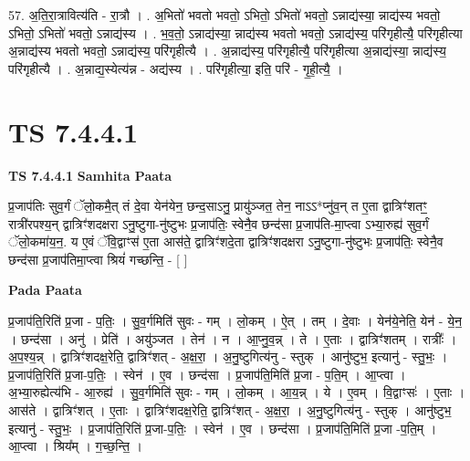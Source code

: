 \documentclass[17pt]{extarticle}
\begin{document}
57. अ॒ति॒रा॒त्रावित्य॑ति - रा॒त्रौ । . अ॒भितो॑ भवतो भवतो॒ ऽभितो॒ ऽभितो॑ भवतो॒ ऽन्नाद्य॑स्या॒ न्नाद्य॑स्य भवतो॒ ऽभितो॒ ऽभितो॑ भवतो॒ ऽन्नाद्य॑स्य । . भ॒व॒तो॒ ऽन्नाद्य॑स्या॒ न्नाद्य॑स्य भवतो भवतो॒ ऽन्नाद्य॑स्य॒ परि॑गृहीत्यै॒ परि॑गृहीत्या अ॒न्नाद्य॑स्य भवतो भवतो॒ ऽन्नाद्य॑स्य॒ परि॑गृहीत्यै । . अ॒न्नाद्य॑स्य॒ परि॑गृहीत्यै॒ परि॑गृहीत्या अ॒न्नाद्य॑स्या॒ न्नाद्य॑स्य॒ परि॑गृहीत्यै । . अ॒न्नाद्य॒स्येत्य॑न्न - अद्य॑स्य । . परि॑गृहीत्या॒ इति॒ परि॑ - गृ॒ही॒त्यै॒ । \newline
\pagebreak
{}

\section{ TS 7.4.4.1 }

\textbf{TS 7.4.4.1 } \newline
\textbf{Samhita Paata} \newline

प्र॒जाप॑तिः सुव॒र्गं ॅलो॒कमै॒त् तं दे॒वा येन॑येन॒ छन्द॒साऽनु॒ प्रायु॑ञ्जत॒ तेन॒ नाऽऽ*प्नु॑व॒न् त ए॒ता द्वात्रिꣳ॑शतꣳ॒॒ रात्री॑रपश्य॒न् द्वात्रिꣳ॑शदक्षरा ऽनु॒ष्टुगा-नु॑ष्टुभः प्र॒जाप॑तिः॒ स्वेनै॒व छन्द॑सा प्र॒जाप॑ति-मा॒प्त्वा ऽभ्या॒रुह्य॑ सुव॒र्गं ॅलो॒कमा॑य॒न॒. य ए॒वं ॅवि॒द्वाꣳस॑ ए॒ता आस॑ते॒ द्वात्रिꣳ॑शदे॒ता द्वात्रिꣳ॑शदक्षरा ऽनु॒ष्टुगा-नु॑ष्टुभः प्र॒जाप॑तिः॒ स्वेनै॒व छन्द॑सा प्र॒जाप॑तिमा॒प्त्वा श्रियं॑ गच्छन्ति॒ - [  ] \newline

\textbf{Pada Paata} \newline

प्र॒जाप॑ति॒रिति॑ प्र॒जा - प॒तिः॒ । सु॒व॒र्गमिति॑ सुवः - गम् । लो॒कम् । ऐ॒त् । तम् । दे॒वाः । येन॑ये॒नेति॒ येन॑ - ये॒न॒ । छन्द॑सा । अनु॑ । प्रेति॑ । अयु॑ञ्जत । तेन॑ । न । आ॒प्नु॒व॒न्न् । ते । ए॒ताः । द्वात्रिꣳ॑शतम् । रात्रीः᳚ । अ॒प॒श्य॒न्न् । द्वात्रिꣳ॑शदक्ष॒रेति॒ द्वात्रिꣳ॑शत् - अ॒क्ष॒रा॒ । अ॒नु॒ष्टुगित्य॑नु - स्तुक् । आनु॑ष्टुभ॒ इत्यानु॑ - स्तु॒भः॒ । प्र॒जाप॑ति॒रिति॑ प्र॒जा-प॒तिः॒ । स्वेन॑ । ए॒व । छन्द॑सा । प्र॒जाप॑ति॒मिति॑ प्र॒जा - प॒ति॒म् । आ॒प्त्वा । अ॒भ्या॒रुह्येत्य॑भि - आ॒रुह्य॑ । सु॒व॒र्गमिति॑ सुवः - गम् । लो॒कम् । आ॒य॒न्न् । ये । ए॒वम् । वि॒द्वाꣳसः॑ । ए॒ताः । आस॑ते । द्वात्रिꣳ॑शत् । ए॒ताः । द्वात्रिꣳ॑शदक्ष॒रेति॒ द्वात्रिꣳ॑शत् - अ॒क्ष॒रा॒ । अ॒नु॒ष्टुगित्य॑नु - स्तुक् । आनु॑ष्टुभ॒ इत्यानु॑ - स्तु॒भः॒ । प्र॒जाप॑ति॒रिति॑ प्र॒जा-प॒तिः॒ । स्वेन॑ । ए॒व । छन्द॑सा । प्र॒जाप॑ति॒मिति॑ प्र॒जा -प॒ति॒म् । आ॒प्त्वा । श्रिय᳚म् । ग॒च्छ॒न्ति॒ ।  \newline
\end{document}
